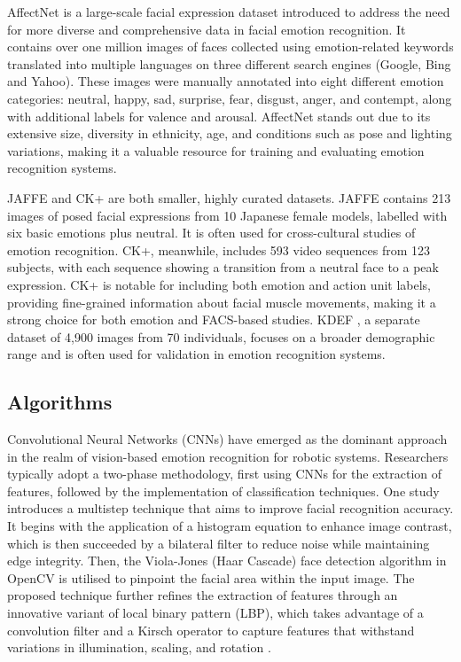 AffectNet \cite{Mollahosseini2017-bj} is a large-scale facial expression dataset introduced to address the need for more diverse and comprehensive data in facial emotion recognition. It contains over one million images of faces collected using emotion-related keywords translated into multiple languages on three different search engines (Google, Bing and Yahoo). These images were manually annotated into eight different emotion categories: neutral, happy, sad, surprise, fear, disgust, anger, and contempt, along with additional labels for valence and arousal. AffectNet stands out due to its extensive size, diversity in ethnicity, age, and conditions such as pose and lighting variations, making it a valuable resource for training and evaluating emotion recognition systems.

JAFFE \cite{jaffe}  and CK+ are both smaller, highly curated datasets. JAFFE contains 213 images of posed facial expressions from 10 Japanese female models, labelled with six basic emotions plus neutral. It is often used for cross-cultural studies of emotion recognition. CK+, meanwhile, includes 593 video sequences from 123 subjects, with each sequence showing a transition from a neutral face to a peak expression. CK+ is notable for including both emotion and action unit labels, providing fine-grained information about facial muscle movements, making it a strong choice for both emotion and FACS-based studies. KDEF \cite{Lundqvist2015-in}, a separate dataset of 4,900 images from 70 individuals, focuses on a broader demographic range and is often used for validation in emotion recognition systems.

\subsection{Algorithms}

Convolutional Neural Networks (CNNs) have emerged as the dominant approach in the realm of vision-based emotion recognition for robotic systems. Researchers typically adopt a two-phase methodology, first using CNNs for the extraction of features, followed by the implementation of classification techniques. One study introduces a multistep technique that aims to improve facial recognition accuracy. It begins with the application of a histogram equation to enhance image contrast, which is then succeeded by a bilateral filter to reduce noise while maintaining edge integrity. Then, the Viola-Jones (Haar Cascade) face detection algorithm in OpenCV is utilised to pinpoint the facial area within the input image. The proposed technique further refines the extraction of features through an innovative variant of local binary pattern (LBP), which takes advantage of a convolution filter and a Kirsch operator to capture features that withstand variations in illumination, scaling, and rotation \cite{Mistry2020-gr}.

